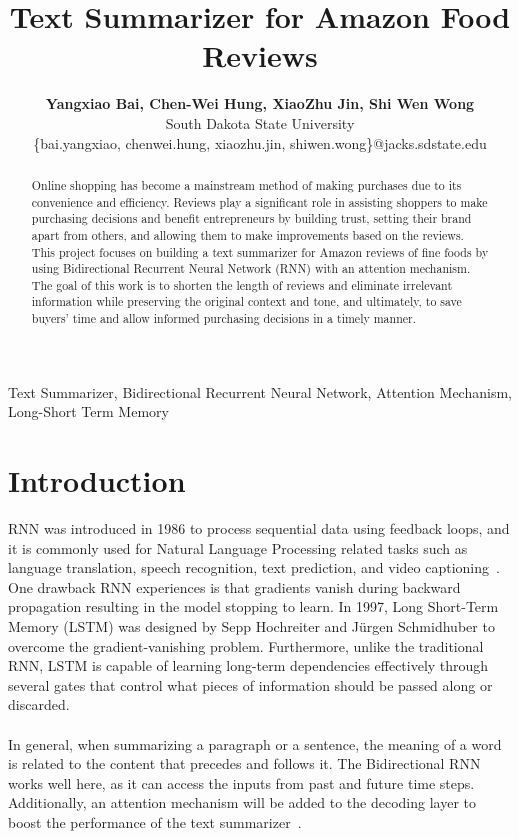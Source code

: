 \documentclass[conference]{IEEEtran}
\begin{document}
\title{\textbf{Text Summarizer for Amazon Food Reviews}\\}
\author{\textbf{\Large{Yangxiao Bai, Chen-Wei Hung, XiaoZhu Jin, Shi Wen Wong}} \\
South Dakota State University \\
\{bai.yangxiao, chenwei.hung, xiaozhu.jin, shiwen.wong\}@jacks.sdstate.edu \\
}

\maketitle

\begin{abstract}
Online shopping has become a mainstream method of making purchases due to its convenience and efficiency. Reviews play a significant role in assisting shoppers to make purchasing decisions and benefit entrepreneurs by building trust, setting their brand apart from others, and allowing them to make improvements based on the reviews. This project focuses on building a text summarizer for Amazon reviews of fine foods by using Bidirectional Recurrent Neural Network (RNN) with an attention mechanism. The goal of this work is to shorten the length of reviews and eliminate irrelevant information while preserving the original context and tone, and ultimately, to save buyers’ time and allow informed purchasing decisions in a timely manner. \\
\end{abstract} 

\begin{IEEEkeywords}
Text Summarizer, Bidirectional Recurrent Neural Network, Attention Mechanism, Long-Short Term Memory
\end{IEEEkeywords}

\section{Introduction}
RNN was introduced in 1986 to process sequential data using feedback loops, and it is commonly used for Natural Language Processing related tasks such as language translation, speech recognition, text prediction, and video captioning~\cite{staudemeyer2019understanding}. One drawback RNN experiences is that gradients vanish during backward propagation resulting in the model stopping to learn. In 1997, Long Short-Term Memory (LSTM) was designed by Sepp Hochreiter and J\"{u}rgen Schmidhuber to overcome the gradient-vanishing problem. Furthermore, unlike the traditional RNN, LSTM is capable of learning long-term dependencies effectively through several gates that control what pieces of information should be passed along or discarded. \\ \\
\indent In general, when summarizing a paragraph or a sentence, the meaning of a word is related to the content that precedes and follows it. The Bidirectional RNN works well here, as it can access the inputs from past and future time steps. Additionally, an attention mechanism will be added to the decoding layer to boost the performance of the text summarizer~\cite{vaswani2017attention}. 
\end{document}
